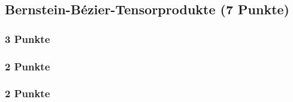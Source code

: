 \newif\ifvimbug
\vimbugfalse

\ifvimbug

\fi


\subsection{Bernstein-Bézier-Tensorprodukte (7 Punkte)}
\subsubsection{3 Punkte}
\subsubsection{2 Punkte}
\subsubsection{2 Punkte}